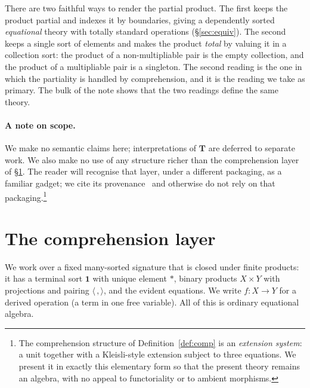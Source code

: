 \documentclass[11pt]{article}
\theoremstyle{definition}
\theoremstyle{plain}
\newcommand{\one}{\mathbf{1}}           %
\newcommand{\pt}{\ast}                  %
\begin{document}
There are two faithful ways to render the partial product. The first keeps the
product partial and indexes it by boundaries, giving a dependently sorted
\emph{equational} theory with totally standard operations
(\S\ref{sec:equiv}). The second keeps a single sort of elements and makes the
product \emph{total} by valuing it in a collection sort: the product of a
non-multipliable pair is the empty collection, and the product of a
multipliable pair is a singleton. The second reading is the one in which the
partiality is handled by comprehension, and it is the reading we take as
primary. The bulk of the note shows that the two readings define the same
theory.

\paragraph{A note on scope.} We make no semantic claims here; interpretations of
$\mathbf{T}$ are deferred to separate work. We also make no use of any structure
richer than the comprehension layer of \S\ref{sec:comp}. The reader will
recognise that layer, under a different packaging, as a familiar gadget; we cite
its provenance~\cite{wadler,moggi} and otherwise do not rely on that
packaging.\footnote{The comprehension structure of
Definition~\ref{def:comp} is an \emph{extension system}: a unit together with a
Kleisli-style extension subject to three equations. We present it in exactly
this elementary form so that the present theory remains an algebra, with no
appeal to functoriality or to ambient morphisms.}

\section{The comprehension layer}\label{sec:comp}

We work over a fixed many-sorted signature that is closed under finite products:
it has a terminal sort $\one$ with unique element $\pt$, binary products
$X\times Y$ with projections and pairing $\langle\,,\rangle$, and the evident
equations. We write $f\colon X\to Y$ for a derived operation (a term in one free
variable). All of this is ordinary equational algebra.
\end{document}
